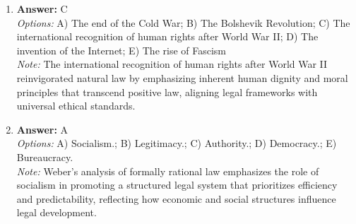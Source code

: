 \documentclass[12pt]{article}
\begin{document}
\begin{enumerate}[label=\arabic*.]
\item \textbf{Answer:} C
\\ \textit{Options:} A) The end of the Cold War; B) The Bolshevik Revolution; C) The international recognition of human rights after World War II; D) The invention of the Internet; E) The rise of Fascism
\\ \textit{Note:} The international recognition of human rights after World War II reinvigorated natural law by emphasizing inherent human dignity and moral principles that transcend positive law, aligning legal frameworks with universal ethical standards.
\item \textbf{Answer:} A
\\ \textit{Options:} A) Socialism.; B) Legitimacy.; C) Authority.; D) Democracy.; E) Bureaucracy.
\\ \textit{Note:} Weber's analysis of formally rational law emphasizes the role of socialism in promoting a structured legal system that prioritizes efficiency and predictability, reflecting how economic and social structures influence legal development.
\end{enumerate}
\end{document}
